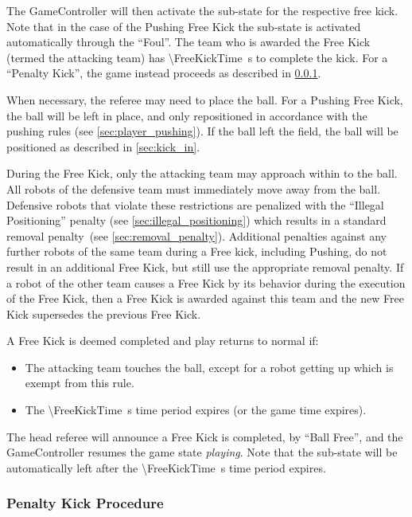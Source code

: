 The GameController will then activate the sub-state for the respective free kick. Note that in the case of the Pushing Free Kick the sub-state is activated automatically through the ``Foul''.
The team who is awarded the Free Kick (termed the attacking team) has \qty{\FreeKickTime}{\second} to complete the kick.
For a ``Penalty Kick'', the game instead proceeds as described in \cref{sec:penalty_free_kick}.

When necessary, the referee may need to place the ball.
For a Pushing Free Kick, the ball will be left in place, and only repositioned in accordance with the pushing rules (see \cref{sec:player_pushing}).
If the ball left the field, the ball will be positioned as described in \cref{sec:kick_in}.

During the Free Kick, only the attacking team may approach within \FreeKickRadius to the ball. All robots of the defensive team must immediately move away from the ball. Defensive robots that violate these restrictions are penalized with the ``Illegal Positioning'' penalty (see \cref{sec:illegal_positioning}) which results in a standard removal penalty~(see \cref{sec:removal_penalty}).
Additional penalties against any further robots of the same team during a Free kick, including Pushing, do not result in an additional Free Kick, but still use the appropriate removal penalty. If a robot of the other team causes a Free Kick by its behavior during the execution of the Free Kick, then a Free Kick is awarded against this team and the new Free Kick supersedes the previous Free Kick.

A Free Kick is deemed completed and play returns to normal if:
\begin{itemize}
    \item The attacking team touches the ball, except for a robot getting up which is exempt from this rule.
    \item The \qty{\FreeKickTime}{\second} time period expires (or the game time expires).
\end{itemize}
The head referee will announce a Free Kick is completed, by ``Ball Free'', and the GameController resumes the game state \emph{playing}. Note that the sub-state will be automatically left after the \qty{\FreeKickTime}{\second} time period expires.

\subsubsection{Penalty Kick Procedure}
\label{sec:penalty_free_kick}

